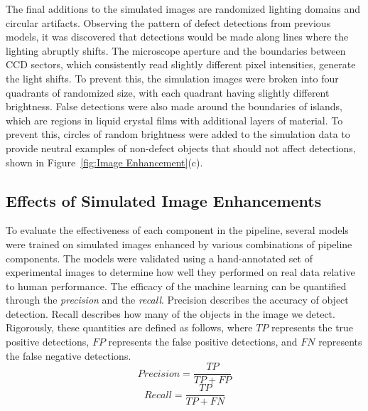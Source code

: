 \documentclass[twoside,twocolumn,9pt]{article}
\begin{document}
The final additions to the simulated images are randomized lighting domains and circular artifacts. Observing the pattern of defect detections from previous models, it was discovered that detections would be made along lines where the lighting abruptly shifts. The microscope aperture and the boundaries between CCD sectors, which consistently read slightly different pixel intensities, generate the light shifts. To prevent this, the simulation images were broken into four quadrants of randomized size, with each quadrant having slightly different brightness. False detections were also made around the boundaries of islands, which are regions in liquid crystal films with additional layers of material. To prevent this, circles of random brightness were added to the simulation data to provide neutral examples \cite{koppel_importance_2006} of non-defect objects that should not affect detections, shown in Figure~\ref{fig:Image Enhancement}(c).

\subsection{Effects of Simulated Image Enhancements}

To evaluate the effectiveness of each component in the pipeline, several models were trained on simulated images enhanced by various combinations of pipeline components. The models were validated using a hand-annotated set of experimental images to determine how well they performed on real data relative to human performance. The efficacy of the machine learning can be quantified through the \textit{precision} and the \textit{recall}. Precision describes the accuracy of object detection. Recall describes how many of the objects in the image we detect. Rigorously, these quantities are defined as follows, where $TP$ represents the true positive detections, $FP$ represents the false positive detections, and $FN$ represents the false negative detections.
\begin{equation}
Precision = \frac{TP}{TP+FP}
\end{equation}
\begin{equation}
Recall = \frac{TP}{TP+FN}
\end{equation} 
\end{document}

